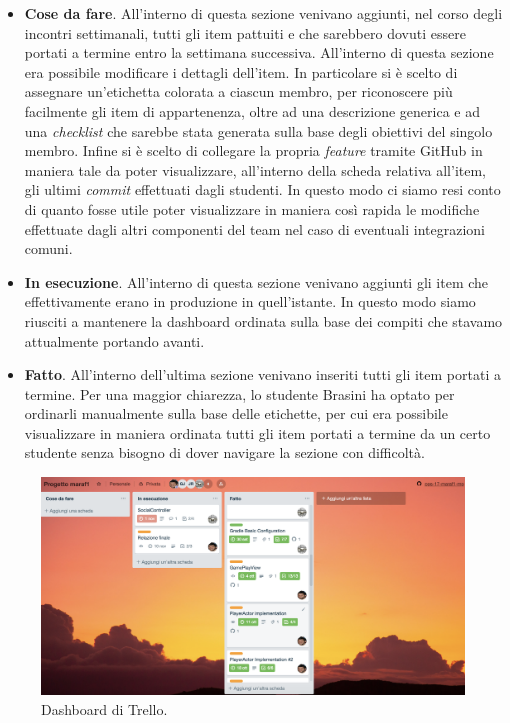      \begin{itemize}
     \item \textbf{Cose da fare}. All'interno di questa sezione venivano aggiunti, nel corso degli incontri settimanali, tutti gli item pattuiti e che sarebbero dovuti essere portati a termine entro la settimana successiva. All'interno di questa sezione era possibile modificare i dettagli dell'item. In particolare si è scelto di assegnare un'etichetta colorata a ciascun membro, per riconoscere più facilmente gli item di appartenenza, oltre ad una descrizione generica e ad una \textit{checklist} che sarebbe stata generata sulla base degli obiettivi del singolo membro. Infine si è scelto di collegare la propria \textit{feature} tramite GitHub in maniera tale da poter visualizzare, all'interno della scheda relativa all'item, gli ultimi \textit{commit} effettuati dagli studenti. In questo modo ci siamo resi conto di quanto fosse utile poter visualizzare in maniera così rapida le modifiche effettuate dagli altri componenti del team nel caso di eventuali integrazioni comuni.
    \item \textbf{In esecuzione}. All'interno di questa sezione venivano aggiunti gli item che effettivamente erano in produzione in quell'istante. In questo modo siamo riusciti a mantenere la dashboard ordinata sulla base dei compiti che stavamo attualmente portando avanti.
    \item \textbf{Fatto}. All'interno dell'ultima sezione venivano inseriti tutti gli item portati a termine. Per una maggior chiarezza, lo studente Brasini ha optato per ordinarli manualmente sulla base delle etichette, per cui era possibile visualizzare in maniera ordinata tutti gli item portati a termine da un certo studente senza bisogno di dover navigare la sezione con difficoltà.
    	\end{itemize}

     	  \begin{figure}[!tbh]
 	 \includegraphics[width=\linewidth]{trello_dashboard.png}
 	 \caption{Dashboard di Trello.}
  	\label{fig:trello_dashboard}
	\end{figure}

